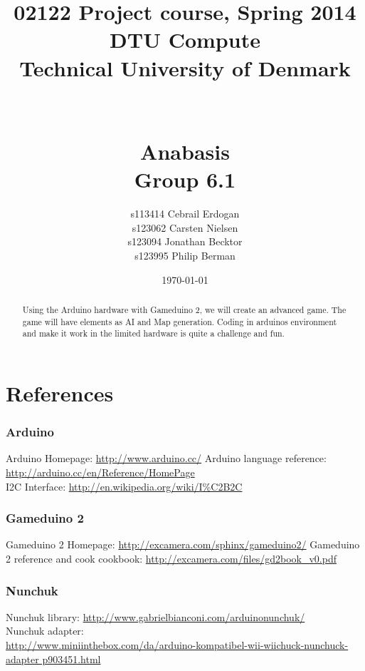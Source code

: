 \documentclass[12pt]{report}
\title{02122 Project course, Spring 2014 \\
DTU Compute \\
Technical University of Denmark \\~\\~\\ Anabasis \\ Group 6.1}
\author{s113414 Cebrail Erdogan \\
        s123062 Carsten Nielsen \\
        s123094 Jonathan Becktor\\
        s123995 Philip Berman   \\  }
\date{\today}
\begin{document}
\pagestyle{headings}



\maketitle

\begin{abstract}
Using the Arduino hardware with Gameduino 2, we will create an advanced game.
The game will have elements as AI and Map generation.
Coding in arduinos environment and make it work in the
limited hardware is quite a challenge and fun.
\end{abstract}


\tableofcontents

\newpage



\newpage

















\chapter{References}

\subsection*{Arduino}
Arduino Homepage: \url{http://www.arduino.cc/}
Arduino language reference: \url{http://arduino.cc/en/Reference/HomePage}\\
I2C Interface: \url{http://en.wikipedia.org/wiki/I%C2B2C}

\subsection*{Gameduino 2}
Gameduino 2 Homepage: \url{http://excamera.com/sphinx/gameduino2/}
Gameduino 2 reference and cook cookbook: \url{http://excamera.com/files/gd2book\_v0.pdf}


\subsection*{Nunchuk}
Nunchuk library: \url{http://www.gabrielbianconi.com/arduinonunchuk/} \\
Nunchuk adapter: \\ \url{http://www.miniinthebox.com/da/arduino-kompatibel-wii-wiichuck-nunchuck-adapter p903451.html}
\end{document}
